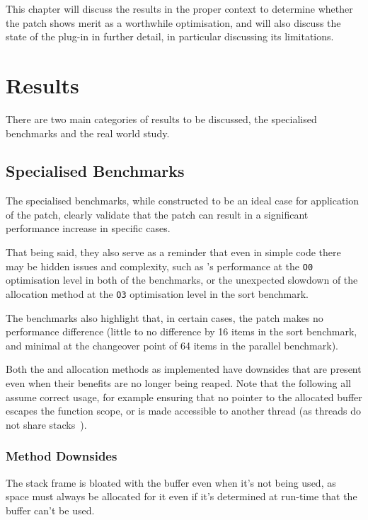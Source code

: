 This chapter will discuss the results in the proper context to determine whether the patch shows merit as a worthwhile optimisation, and will also discuss the state of the plug-in in further detail, in particular discussing its limitations.

\section{Results}

There are two main categories of results to be discussed, the specialised benchmarks and the real world study.

\subsection{Specialised Benchmarks}

The specialised benchmarks, while constructed to be an ideal case for application of the patch, clearly validate that the patch can result in a significant performance increase in specific cases. 

That being said, they also serve as a reminder that even in simple code there may be hidden issues and complexity, such as 's performance at the \texttt{O0} optimisation level in both of the benchmarks, or the unexpected slowdown of the  allocation method at the \texttt{O3} optimisation level in the sort benchmark.

The benchmarks also highlight that, in certain cases, the patch makes no performance difference (little to no difference by 16 items in the sort benchmark, and minimal at the changeover point of 64 items in the parallel benchmark).

Both the  and  allocation methods as implemented have downsides that are present even when their benefits are no longer being reaped. Note that the following all assume correct usage, for example ensuring that no pointer to the allocated buffer escapes the function scope, or is made accessible to another thread (as threads do not share stacks~\cite{threadstack}).

\subsubsection{ Method Downsides}

The stack frame is bloated with the buffer even when it's not being used, as space must always be allocated for it even if it's determined at run-time that the buffer can't be used.

